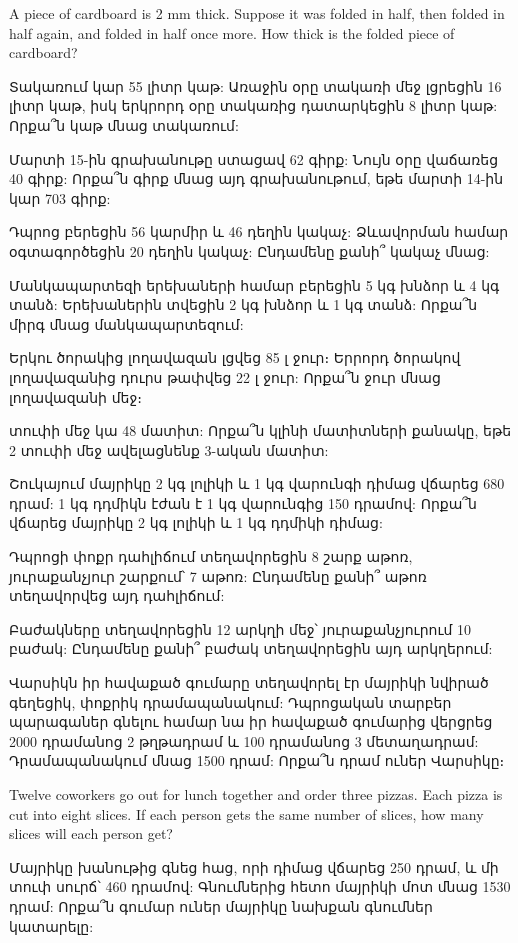 \problem
A piece of cardboard is 2 mm thick. Suppose it was 
folded in half, then folded in half again, and folded 
in half once more. How thick is the folded piece of 
cardboard?

\problem 
Տակառում կար 55 լիտր կաթ: Առաջին օրը տակառի մեջ 
լցրեցին 16 լիտր կաթ, իսկ երկրորդ օրը տակառից 
դատարկեցին 8 լիտր կաթ: Որքա՞ն կաթ մնաց տակառում:

\problem
Մարտի 15-ին գրախանութը ստացավ 62 գիրք: Նույն օրը 
վաճառեց 40 գիրք: Որքա՞ն գիրք մնաց այդ գրախանութում, 
եթե մարտի 14-ին կար 703 գիրք:

\problem 
Դպրոց բերեցին 56 կարմիր և 46 դեղին կակաչ: Ձևավորման 
համար օգտագործեցին 20 դեղին կակաչ: Ընդամենը քանի՞ 
կակաչ մնաց:

\problem
Մանկապարտեզի երեխաների համար բերե\-ցին 5 կգ խնձոր և 4 
կգ տանձ: Երեխաներին տվեցին 2 կգ խնձոր և 1 կգ տանձ: 
Որքա՞ն միրգ մնաց մանկապարտեզում:

\problem 
Երկու ծորակից լողավազան լցվեց 85 լ ջուր։ Երրորդ ծորակով 
լողավազանից դուրս թափ\-վեց 22 լ ջուր: Որքա՞ն ջուր մնաց 
լողավա\-զանի մեջ։

 տուփի մեջ կա 48 մատիտ: Որքա՞ն կլինի մա\-տիտների 
քանակը, եթե 2 տուփի մեջ ավելաց\-նենք 3-ական մատիտ:

\problem 
Շուկայում մայրիկը 2 կգ լոլիկի և 1 կգ վարունգի դիմաց վճարեց 
680 դրամ: 1 կգ դդմիկն էժան է 1 կգ վարունգից 150 դրամով: 
Որքա՞ն վճարեց մայրիկը 2 կգ լոլիկի և 1 կգ դդմիկի դիմաց:

\problem
Դպրոցի փոքր դահլիճում տեղավորեցին 8 շարք աթոռ, յուրաքանչյուր 
շարքում՝ 7 աթոռ: Ընդամենը քանի՞ աթոռ տեղավորվեց այդ դահլիճում:

\problem
Բաժակները տեղավորեցին 12 արկղի մեջ՝ յուրաքանչյուրում 10 
բաժակ: Ընդամենը քանի՞ բաժակ տեղավորեցին այդ արկղերում:

\problem
Վարսիկն իր հավաքած գումարը տեղա\-վորել էր մայրիկի նվիրած 
գեղեցիկ, փոքրիկ դրամա\-պանակում: Դպրոցական տարբեր պա\-րագաներ 
գնելու համար նա իր հավաքած գումարից վերցրեց 2000 դրամանոց 
2 թղթա\-դրամ և 100 դրամանոց 3 մետաղադրամ: Դրամապանակում 
մնաց 1500 դրամ: Որքա՞ն դրամ ուներ Վարսիկը։

\problem
Twelve coworkers go out for lunch together and order three 
pizzas. Each pizza is cut into eight slices. If each person 
gets the same number of slices, how many slices will each 
person get?

\problem
Մայրիկը խանութից գնեց հաց, որի դիմաց վճարեց 250 դրամ, 
և մի տուփ սուրճ՝ 460 դրամով: Գնումներից հետո մայրիկի 
մոտ մնաց 1530 դրամ: Որքա՞ն գումար ուներ մայրիկը նախքան 
գնումներ կատարելը:


